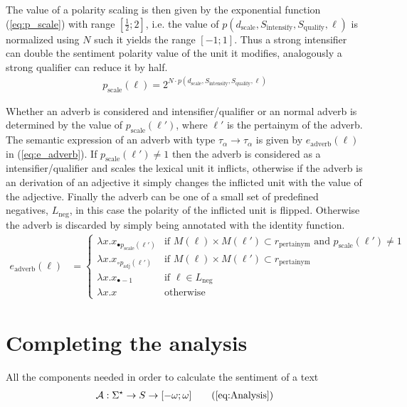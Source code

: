 The value of a polarity scaling is then given by the exponential function (\ref{eq:p_scale}) with range $\left[\frac{1}{2}; 2 \right]$, i.e. the value of $p(d_\mathrm{scale}, S_\mathrm{intensify}, S_\mathrm{qualify}, \ell)$ is normalized using $N$ such it yields the range $[-1; 1]$. Thus a strong intensifier can double the sentiment polarity value of the unit it modifies, analogously a strong qualifier can reduce it by half.  
\begin{align}
    p_\mathrm{scale}(\ell) = 2^{N \cdot p(d_\mathrm{scale}, S_\mathrm{intensify}, S_\mathrm{qualify}, \ell)}
    \label{eq:p_scale}
\end{align}

Whether an adverb is considered and intensifier/qualifier or an normal adverb is determined by the value of $p_\mathrm{scale}(\ell')$, where $\ell'$ is the pertainym of the adverb. The semantic expression of an adverb with type $\tau_\alpha \to \tau_\alpha$ is given by $e_\mathrm{adverb}(\ell)$ in (\ref{eq:e_adverb}). If $p_\mathrm{scale}(\ell') \neq 1$ then the adverb is considered as a intensifier/qualifier and scales the lexical unit it inflicts, otherwise if the adverb is an derivation of an adjective it simply changes the inflicted unit with the value of the adjective. Finally the adverb can be one of a small set of predefined negatives, $L_\mathrm{neg}$, in this case the polarity of the inflicted unit is flipped. Otherwise the adverb is discarded by simply being annotated with the identity function.
\begin{align}
	e_\mathrm{adverb}(\ell) &=
	\begin{cases}    
    \lambda x . x_{\bullet p_\mathrm{scale}(\ell')} & \text{if $M(\ell) \times M(\ell') \subset r_\mathrm{pertainym}$ and $p_\mathrm{scale}(\ell') \neq 1$} \\
    \lambda x . x_{\circ p_\mathrm{adj}(\ell')} & \text{if $M(\ell) \times M(\ell') \subset r_\mathrm{pertainym}$} \\
    \lambda x . x_{\bullet -1} & \text{if $\ell \in L_\mathrm{neg}$}\\
    \lambda x . x & \text{otherwise}
	\end{cases}
	\label{eq:e_adverb}
\end{align}

\section{Completing the analysis}
All the components needed in order to calculate the sentiment of a text 
  \begin{align}
	 \mathcal{A}: \Sigma^\star \to S \to [-\omega;\omega] \tag{\ref{eq:Analysis}}	 
  \end{align}
